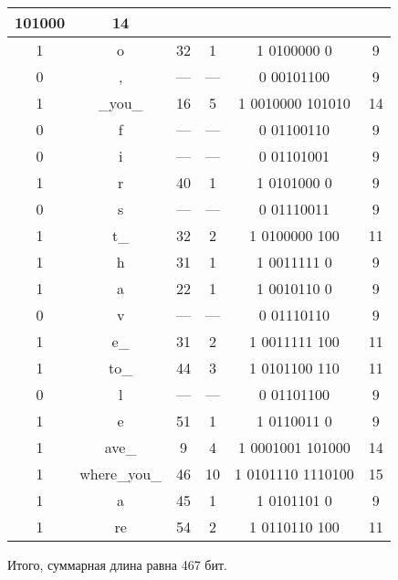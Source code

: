 \begin{center}
\begin{longtable}{|c|c|c|c|c|c|}
101000&14\\  \hline  1&o&32&1&1 0100000 0&9\\  \hline  0&,&---&---&0 00101100&9\\  \hline  1&\_you\_&16&5&1 0010000 101010&14\\  \hline  0&f&---&---&0 01100110&9\\  \hline  0&i&---&---&0 01101001&9\\  \hline  1&r&40&1&1 0101000 0&9\\  \hline  0&s&---&---&0 01110011&9\\  \hline  1&t\_&32&2&1 0100000 100&11\\  \hline  1&h&31&1&1 0011111 0&9\\  \hline  1&a&22&1&1 0010110 0&9\\  \hline  0&v&---&---&0 01110110&9\\  \hline  1&e\_&31&2&1 0011111 100&11\\  \hline  1&to\_&44&3&1 0101100 110&11\\  \hline  0&l&---&---&0 01101100&9\\  \hline  1&e&51&1&1 0110011 0&9\\  \hline  1&ave\_&9&4&1 0001001 101000&14\\  \hline  1&where\_you\_&46&10&1 0101110 1110100&15\\  \hline  1&a&45&1&1 0101101 0&9\\  \hline  1&re&54&2&1 0110110 100&11\\  \hline 
    \end{longtable}
\end{center}

Итого, суммарная длина равна 467 бит.
